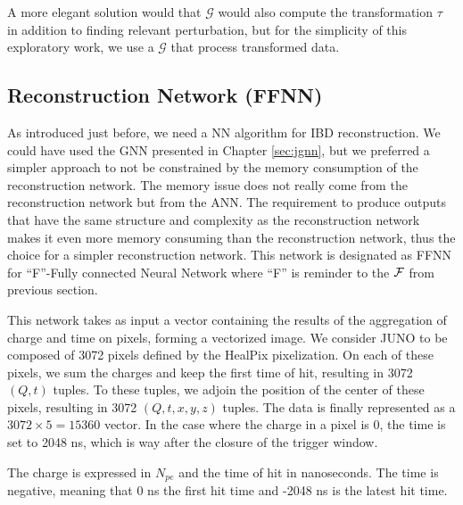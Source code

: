 \documentclass[../main.tex]{subfiles}
\begin{document}
A more elegant solution would that $\mathcal{G}$ would also compute the transformation $\tau$ in addition to finding relevant perturbation, but for the simplicity of this exploratory work, we use a $\mathcal{G}$ that process transformed data.

\subsection{Reconstruction Network (FFNN)}
\label{sec:janne:arch:reco}

As introduced just before, we need a NN algorithm for IBD reconstruction. We could have used the GNN presented in Chapter \ref{sec:jgnn}, but we preferred a simpler approach to not be constrained by the memory consumption of the reconstruction network. The memory issue does not really come from the reconstruction network but from the ANN. The requirement to produce outputs that have the same structure and complexity as the reconstruction network makes it even more memory consuming than the reconstruction network, thus the choice for a simpler reconstruction network. This network is designated as FFNN for ``F''-Fully connected Neural Network where ``F'' is reminder to the ${\cal F}$ from previous section.

This network takes as input a vector containing the results of the aggregation of charge and time on pixels, forming a vectorized image. We consider JUNO to be composed of 3072 pixels defined by the HealPix \cite{gorski_healpix_2005} pixelization. On each of these pixels, we sum the charges and keep the first time of hit, resulting in 3072 $(Q,t)$ tuples. To these tuples, we adjoin the position of the center of these pixels, resulting in 3072 $(Q,t,x,y,z)$ tuples. The data is finally represented as a $3072 \times 5 = 15360$ vector. In the case where the charge in a pixel is 0, the time is set to 2048 ns, which is way after the closure of the trigger window.

The charge is expressed in $N_{pe}$ and the time of hit in nanoseconds. The time is negative, meaning that 0 ns the first hit time and -2048 ns is the latest hit time.
\end{document}
